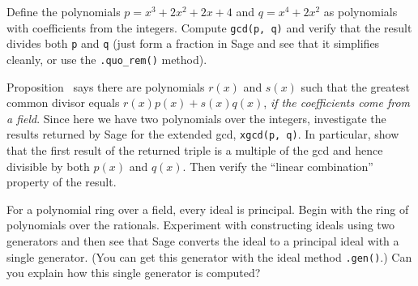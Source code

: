 %
%
Define the polynomials $p = x^3 + 2x^2 + 2x + 4$ and $q = x^4 + 2x^2$ as polynomials with coefficients from the integers.  Compute \verb?gcd(p, q)? and verify that the result divides both \verb?p? and \verb?q? (just form a fraction in Sage and see that it simplifies cleanly, or use the \verb?.quo_rem()? method).\par
%
Proposition~ says there are polynomials $r(x)$ and $s(x)$ such that the greatest common divisor equals $r(x)p(x)+s(x)q(x)$, \emph{if the coefficients come from a field}.  Since here we have two polynomials over the integers, investigate the results returned by Sage for the extended gcd, \verb?xgcd(p, q)?.  In particular, show that the first result of the returned triple is a multiple of the gcd and hence divisible by both $p(x)$ and $q(x)$.  Then verify the ``linear combination'' property of the result.
\begin{sageverbatim}\end{sageverbatim}
%
%
For a polynomial ring over a field, every ideal is principal.  Begin with the ring of polynomials over the rationals.  Experiment with constructing ideals using two generators and then see that Sage converts the ideal to a principal ideal with a single generator.  (You can get this generator with the ideal method \verb?.gen()?.)  Can you explain how this single generator is computed?
\begin{sageverbatim}\end{sageverbatim}
